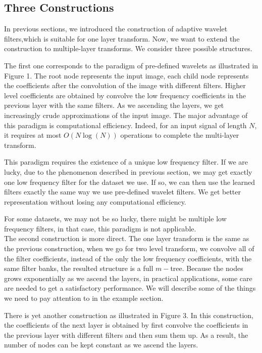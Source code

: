 \documentclass[a4paper]{article}
\begin{document}
\subsection{Three Constructions}
In previous sections, we introduced the construction of adaptive wavelet filters,which is suitable for one layer transform. Now, we want to extend the construction to multiple-layer transforms. We consider three possible structures.

The first one corresponds to the paradigm of pre-defined wavelets as illustrated in Figure 1. The root node represents the input image, each child node represents the coefficients after the convolution of the image with different filters. Higher level coefficients are obtained by convolve the low frequency coefficients in the previous layer with the same filters. As we ascending the layers, we get increasingly crude approximations of the input image. The major advantage of this paradigm is computational efficiency. Indeed, for an input signal of length $N$, it requires at most $O(N\log(N))$ operations to complete the multi-layer transform. 

This paradigm requires the existence of a unique low frequency filter. If we are lucky, due to the phenomenon described in previous section, we may get exactly one low frequency filter for the dataset we use. If so, we can then use the learned filters exactly the same way we use pre-defined wavelet filters. We get better representation without losing any computational efficiency.

For some datasets, we may not be so lucky, there might be multiple low frequency filters, in that case, this paradigm is not applicable.\\

The second construction is more direct. The one layer transform is the same as the previous construction, when we go for two level transform, we convolve all of the filter coefficients, instead of the only the low frequency coefficients, with the same filter banks, the resulted structure is a full $m-$tree. Because the nodes grows exponentially as we ascend the layers, in practical applications, some care are needed to get a satisfactory performance. We will describe some of the things we need to pay attention to in the example section.

There is yet another construction as illustrated in Figure 3. In this construction, the coefficients of the next layer is obtained by first convolve the coefficients in the previous layer with different filters and then sum them up. As a result, the number of nodes can be kept constant as we ascend the layers.
\newpage
\end{document}
